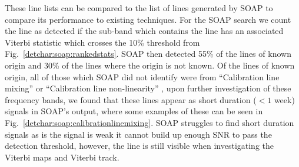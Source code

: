 These line lists can be compared to the list of lines generated by SOAP to compare its performance to existing techniques.
For the SOAP search we count the line as detected if the sub-band which contains the line has an associated Viterbi statistic which crosses the 10\% threshold from Fig.~\ref{detchar:soap:rankedstats}.
SOAP then detected 55\% of the lines of known origin and 30\% of the lines where the origin is not known.
Of the lines of known origin, all of those which SOAP did not identify were from ``Calibration line mixing'' or ``Calibration line non-linearity'' , upon further investigation of these frequency bands, we found that these lines appear as short duration ($< 1$ week) signals in SOAP's output, where some examples of these can be seen in Fig.~\ref{detchar:soap:calibrationlinemixing}.
SOAP struggles to find short duration signals as is the signal is weak it cannot build up enough \gls{SNR} to pass the detection threshold, however, the line is still visible when investigating the Viterbi maps and Viterbi track. 
%
